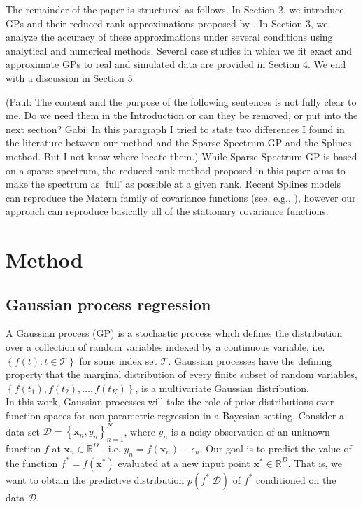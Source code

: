 \documentclass[]{interact}
\theoremstyle{plain}%
\theoremstyle{definition}
\theoremstyle{remark}
\begin{document}
The remainder of the paper is structured as follows. In Section 2, we introduce GPs and their reduced rank approximations proposed by \cite{solin2018hilbert}. In Section 3, we analyze the accuracy of these approximations under several conditions using analytical and numerical methods. Several case studies in which we fit
exact and approximate GPs to real and simulated data are provided in Section 4. We end with a discussion in Section 5.

(Paul: The content and the purpose of the following sentences is not fully clear to me. Do we need them in the Introduction or can they be removed, or put into the next section? Gabi: In this paragraph I tried to state two differences I found in the literature between our method and the Sparse Spectrum GP and the Splines method. But I not know where locate them.) While Sparse Spectrum GP is based on a sparse spectrum, the reduced-rank method proposed in this paper aims to make the spectrum as ‘full’ as possible at a given rank. Recent Splines models can reproduce the Matern family of covariance functions (see, e.g., \cite{wood2003thin}), however our approach can reproduce basically all of the stationary covariance functions.

\vspace{3mm}
\section{Method}\label{sec:bf_method}

\subsection{Gaussian process regression}

A Gaussian process (GP) is a stochastic process which defines the distribution over a collection of random variables indexed by a continuous variable, i.e. $\left\lbrace f(t): t \in \mathcal{T}\right\rbrace$ for some index set $\mathcal{T}$. Gaussian processes have the defining property that the marginal distribution of every finite subset of random variables, $\left\lbrace f(t_1), f(t_2), \hdots, f(t_K) \right\rbrace$, is a multivariate Gaussian distribution.\\

In this work, Gaussian processes will take the role of prior distributions over function spaces for non-parametric regression in a Bayesian setting. 
Consider a data set $\mathcal{D} = \left\lbrace \mathbf{x}_n, y_n \right\rbrace_{n=1}^N$, where $y_n$ is a noisy observation of an unknown function $f$ at $\mathbf{x}_n \in \mathbb{R}^D$ , i.e. $y_n = f(\mathbf{x}_n) + \epsilon_n$. Our goal is to predict the value of the function $f^*=f(\mathbf{x}^*)$ evaluated at a new input point $\mathbf{x}^* \in \mathbb{R}^D$. That is, we want to obtain the predictive distribution $p(f^*|\mathcal{D})$ of $f^*$ conditioned on the data $\mathcal{D}$.\\
\end{document}
